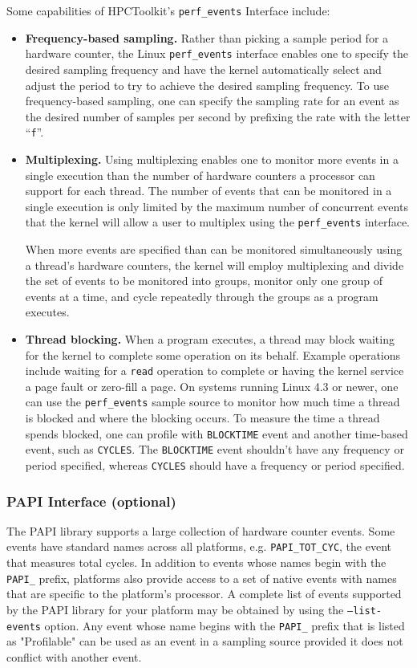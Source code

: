 \documentclass[english]{article}
\begin{document}
Some capabilities of HPCToolkit's \texttt{perf\_events} Interface include:
\begin{itemize}
	\item \textbf{Frequency-based sampling.} 
Rather than picking a sample period for a hardware counter,
the Linux \texttt{perf\_events} interface enables one to specify the desired sampling frequency
and have the kernel automatically select and adjust the period 
to try to achieve the desired sampling frequency.
To use frequency-based sampling, one can specify the sampling rate
for an event as the desired number of samples per second
by prefixing the rate with the letter “\verb+f+”. 

\item \textbf{Multiplexing.} 
Using multiplexing enables one to monitor more events
in a single execution than the number of hardware counters a processor
can support for each thread. The number of events that can be monitored in
a single execution is only limited by the maximum number of concurrent
events that the kernel will allow a user to multiplex using the
\texttt{perf\_events} interface.

When more events are specified than can be monitored simultaneously
using a thread's hardware counters,
  the kernel will employ multiplexing and divide
the set of events to be monitored into groups, monitor only one group
of events at a time, and cycle repeatedly through the groups
as a program executes. 


\item \textbf{Thread blocking.} When a program executes, 
a thread may block waiting for the kernel to complete some operation on its behalf.
Example operations include waiting for a \texttt{read} operation to complete or having the
kernel service a page fault or zero-fill a page. On systems running Linux 4.3 or newer, one can use the \texttt{perf\_events} sample source to monitor how much time a thread is blocked and where the blocking occurs. To measure
the time a thread spends blocked, one can profile with \verb+BLOCKTIME+ event and
another time-based event, such as \verb+CYCLES+. The \verb+BLOCKTIME+ event shouldn't have any frequency or period specified, whereas \verb+CYCLES+ should have a frequency or period specified.

\end{itemize}

\subsubsection{PAPI Interface (optional)}
The PAPI library supports a large collection of hardware counter events.
Some events have standard names across all platforms, e.g. \verb+PAPI_TOT_CYC+, the event that measures total cycles.
In addition to events whose names begin with the \verb+PAPI_+ prefix, platforms also provide access to a set of native events with names that are specific to the platform's processor.
A complete list of events supported by the PAPI library for your platform may be obtained by using the \texttt{--list-events} option.
Any event whose name begins with the \verb+PAPI_+ prefix that is listed as "Profilable" can be used as an event in a sampling source provided it does not conflict with another event.
\end{document}
